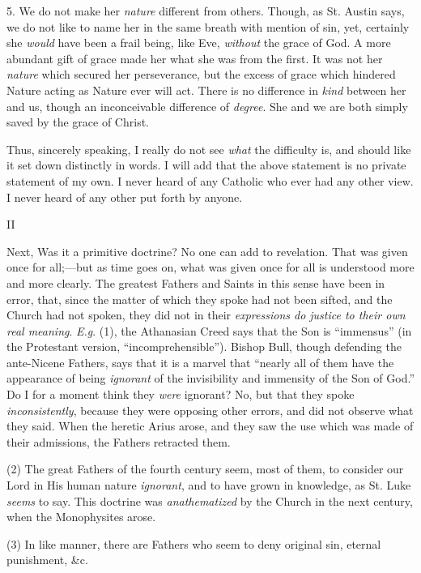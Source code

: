 5. We do not make her \emph{nature}
different from others. Though, as St. Austin says, we do not like to
name her in the same breath with mention of sin, yet, certainly she \emph{would}
have been a frail being, like Eve, \emph{without} the grace of God. A
more abundant gift of grace made her what she was from the first. It was
not her \emph{nature} which secured her perseverance, but the excess of
grace which hindered Nature acting as Nature ever will act. There is no
difference in \emph{kind} between her and us, though an inconceivable
difference of \emph{degree}. She and we are both simply saved by
the grace of Christ.

Thus, sincerely speaking, I
really do not see \emph{what} the difficulty is, and should like it set
down distinctly in words. I will add that the above statement is no
private statement of my own. I never heard of any Catholic who ever had
any other view. I never heard of any other put forth by anyone.

II

Next, Was it a primitive
doctrine? No one can add to revelation. That was given once for
all;—but as time goes on, what was given once for all is understood
more and more clearly. The greatest Fathers and Saints in this sense
have been in error, that, since the matter of which they spoke had not
been sifted, and the Church had not spoken, they did not in their \emph{expressions
do justice to their own real meaning}. \emph{E.g}. (1), the
Athanasian Creed says that the Son is ``immensus'' (in the Protestant
version, ``incomprehensible''). Bishop Bull, though defending the
ante-Nicene Fathers, says that it is a marvel that ``nearly all of them
have the appearance of being \emph{ignorant} of the invisibility and
immensity of the Son of God.'' Do I for a moment think they \emph{were}
ignorant? No, but that they spoke \emph{inconsistently}, because they
were opposing other errors, and did not observe what they said. When the
heretic Arius arose, and they saw the use which was made of their
admissions, the Fathers retracted them.

(2) The great Fathers of the
fourth century seem, most of them, to consider our Lord in His
human nature \emph{ignorant}, and to have grown in knowledge, as St.
Luke \emph{seems} to say. This doctrine was \emph{anathematized} by the
Church in the next century, when the Monophysites arose.

(3) In like manner, there are
Fathers who seem to deny original sin, eternal punishment, \&c.

